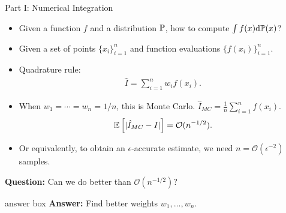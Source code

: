 \documentclass[aspectratio=169,xcolor=dvipsnames]{beamer}
\newenvironment{answerblock}{%
  \begin{beamercolorbox}[wd=\linewidth, sep=0.15em, rounded=true, shadow=true]{answer box}%
}{%
  \end{beamercolorbox}%
}
\begin{document}
\begin{frame}{Part I: Numerical Integration}
    \begin{itemize}
        \item Given a function $f$ and a distribution $\mathbb{P}$, how to compute $\int f(x) \mathrm{d} \mathbb{P}(x)$?
        \item Given a set of points $\{x_i\}_{i=1}^n$ and function evaluations $\{f(x_i)\}_{i=1}^n$.
        \item Quadrature rule:
        \begin{align*}
            \hat{I} = \sum_{i=1}^n w_i f(x_i).
        \end{align*}
        \item When $w_1=\cdots=w_n=1/n$, this is Monte Carlo. $\hat{I}_{MC} = \frac{1}{n}\sum_{i=1}^n f(x_i)$.
        \begin{align*}
            \mathbb{E}\left[|\hat{I}_{MC} - I|\right] = \mathcal{O}(n^{-1/2}).
        \end{align*}
        \item Or equivalently, to obtain an $\epsilon$-accurate estimate, we need $n = \mathcal{O}(\epsilon^{-2})$ samples.
    \end{itemize}
    \begin{exampleblock}{}
        \centering
        \textbf{Question:} Can we do better than $\mathcal{O}(n^{-1/2})$?
    \end{exampleblock}
    \begin{answerblock}{}
    \centering \textbf{Answer:} Find better weights $w_1,\ldots,w_n$.
    \end{answerblock}
\end{frame}
\end{document}
